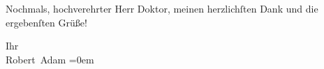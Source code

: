\pstart
           Nochmals, hochverehrter Herr Doktor, meinen herzlichſten Dank und die ergebenſten
               Grüße!\pend
           
\pstart
           Ihr{\\[\baselineskip]}\spacefill\mbox{Robert Adam}\pend
           \leftskip=0em{}\endnumbering{}  \newcommand{\dateiname}{L02268}\newcommand{\titel}{Robert Adam an Arthur Schnitzler, 23. 8. 1917}\newcommand{\editorInnen}{Martin Anton Müller und Gerd-Hermann Susen}
